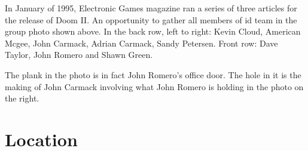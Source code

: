 \begin{minipage}{1.0\textwidth}
\par

\begin{minipage}{.55\textwidth}
In January of 1995, Electronic Games magazine ran a series of three articles for the release of Doom II. An opportunity to gather all members of id team in the group photo shown above. In the back row, left to right: Kevin Cloud, American Mcgee, John Carmack, Adrian Carmack, Sandy Petersen. Front row: Dave Taylor, John Romero and Shawn Green.\\
\par
The plank in the photo is in fact John Romero's office door. The hole in it is the making of John Carmack involving what John Romero is holding in the photo on the right.\\
\end{minipage}
\begin{minipage}{.39\textwidth}
\centering
{}
\par
\end{minipage}

\par
{}
\end{minipage}


\section{Location}


